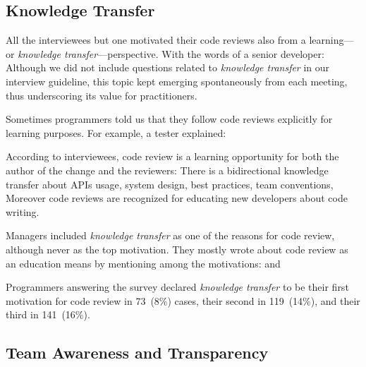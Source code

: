 \subsection{Knowledge Transfer}

All the interviewees but one motivated their code reviews also from a learning---or \emph{knowledge transfer}---perspective. With the words of a senior developer:
 Although we did not
include questions related to \emph{knowledge transfer} in our interview guideline,
this topic kept emerging spontaneously from each meeting, thus underscoring its
value for practitioners.

Sometimes programmers told us that they follow code reviews explicitly for
learning purposes. For example, a tester explained: 

According to interviewees, code review is a learning opportunity for both the
author of the change and the reviewers: There is a bidirectional knowledge
transfer about APIs usage, system design, best practices, team conventions,
 \etc Moreover code reviews are recognized
for educating new developers about code writing.

Managers included \emph{knowledge transfer} as one of the reasons for code review,
although never as the top motivation. They mostly wrote about code review as an
education means by mentioning among the motivations:
  and 

Programmers answering the survey declared \emph{knowledge transfer} to be their
first motivation for code review in 73~(8\%) cases, their second in 119~(14\%),
and their third in 141~(16\%).

\subsection{Team Awareness and Transparency}


